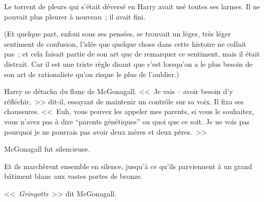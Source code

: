 Le torrent de pleurs qui s'était déversé en Harry avait usé toutes ses larmes. Il ne pouvait plus pleurer à nouveau~; il avait fini.

(Et quelque part, enfoui sous ses pensées, se trouvait un léger, très léger sentiment de confusion, l'idée que quelque chose dans cette histoire ne collait pas~; et cela faisait partie de son art que de remarquer ce sentiment, mais il était distrait. Car il est une triste règle disant que c'est lorsqu'on a le plus besoin de son art de rationaliste qu'on risque le plus de l'oublier.)

Harry se détacha du flanc de McGonagall. <<~Je vais -- avoir besoin d'y réfléchir,~>> dit-il, essayant de maintenir un contrôle sur sa voix. Il fixa ses chaussures. <<~Euh, vous pouvez les appeler mes parents, si vous le souhaitez, vous n'avez pas à dire “parents génétiques” ou quoi que ce soit. Je ne vois pas pourquoi je ne pourrais pas avoir deux mères et deux pères.~>>

McGonagall fut silencieuse.

Et ils marchèrent ensemble en silence, jusqu'à ce qu'ils parviennent à un grand bâtiment blanc aux vastes portes de bronze.

<<~\emph{Gringotts}~>> dit McGonagall.
